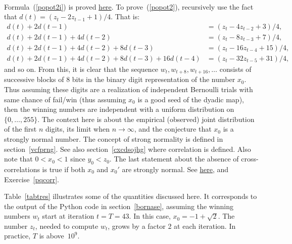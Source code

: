 \documentclass[oneside,10pt]{book}
\newenvironment{proof}[1][Proof]{\begin{trivlist}
\item[\hskip \labelsep {\bfseries #1}]}{\end{trivlist}}
\newcommand{\qed}{\nobreak \ifvmode \relax \else
      \ifdim\lastskip<1.5em \hskip-\lastskip
      \hskip1.5em plus0em minus0.5em \fi \nobreak
      \vrule height0.75em width0.5em depth0.25em\fi}
\begin{document}
\begin{proof} 
\quad \\
Formula~(\ref{popot2i}) is proved \href{https://math.stackexchange.com/questions/3537637/limit-associated-with-a-recursion-connection-to-normality-of-quadratic-irration/3553816}{here}. To prove~(\ref{popot2}), recursively use the fact
 that $d(t) = (z_t - 2z_{t-1} + 1)/4$. That is:   
\begin{align}
d(t) + 2 d(t-1) & = (z_t - 4z_{t-2} + 3)/4, \nonumber \\
d(t) + 2 d(t-1) + 4d(t-2) & = (z_t - 8z_{t-3} + 7)/4,  \nonumber \\
d(t) + 2 d(t-1) + 4d(t-2) + 8d(t-3) & = (z_t - 16z_{t-4} + 15)/4, \nonumber \\
d(t) + 2 d(t-1) + 4d(t-2) + 8d(t-3) + 16d(t-4) & = (z_t - 32z_{t-5} + 31)/4, \nonumber
\end{align}
and so on. From this, it is clear that the sequence $w_t, w_{t+8},w_{t+16},\dots$  consists of successive blocks of 8 bits in the binary digit representation of the
 number $x_0$. Thus assuming these digits are a realization of independent Bernoulli trials with same chance of fail/win (thus
 assuming $x_0$ is a \textcolor{index}{good seed} of the 
\textcolor{index}{dyadic map}),
 then the winning numbers are independent with a uniform distribution on $\{0,\dots,255\}$. The context here is about the empirical (observed) joint distribution of the first $n$ digits, its limit when $n\rightarrow\infty$,  and the conjecture that $x_0$ is a  \textcolor{index}{strongly normal} number. The concept of strong normality is defined in section~\ref{vcfprng}. See also section~\ref{cxcdsojhg} where correlation is defined. Also note that $0<x_0<1$ since
$y_0 < z_0$. The last statement about the absence of cross-correlations is true if both $x_0$ and $x_0'$ are strongly normal. 
See \href{https://stats.stackexchange.com/questions/450922/cross-correlations-in-digit-distributions}{here}, and 
Exercise~\ref{pqcorr}. \qed
\end{proof}\vspace{1ex}

\noindent Table~\ref{tabtres} illustrates some of the quantities discussed here. It corresponds to the output of the Python code
 in section~\ref{bornase}, assuming the winning numbers $w_t$ start at iteration $t = T = 43$. In this case,
 $x_0 = -1 +\sqrt{2}$. The number $z_t$, needed to compute $w_t$, grows by a factor 2 at each iteration.
 In practice, $T$ is above~$10^9$.
\end{document}
